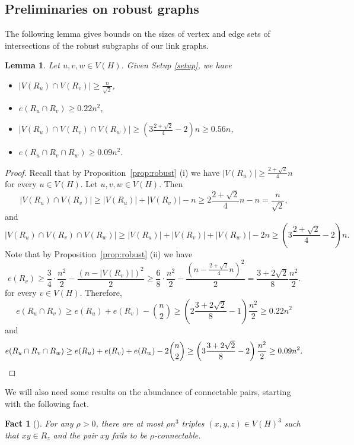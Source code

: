 \documentclass[A4paper,12pt]{article}
\newtheorem{lem}[thm]{Lemma}
\newtheorem{fact}[thm]{Fact}
\theoremstyle{definition}
\begin{document}
\subsection{Preliminaries on robust graphs}

The following lemma gives bounds on the sizes of vertex and edge sets of intersections of the robust subgraphs of our link graphs.  
\begin{lem}\label{lem:robust_intersections}
Let $u,v,w\in V(H)$. Given Setup \ref{setup}, we have
\begin{itemize}
    \item  $|V(R_u) \cap V(R_v)|\geq\frac{n}{\sqrt{2}}$,
    \item $e(R_u\cap R_v) \geq 0.22n^2$,  

\item $|V(R_u)\cap V(R_v)\cap V(R_w)|\geq \left(3\frac{2+\sqrt{2}}{4}-2 \right)n\geq 0.56n$,
\item $e(R_u\cap R_v\cap R_w)\geq 0.09n^2.$
\end{itemize}
\end{lem}
\begin{proof}
Recall that by Proposition~\ref{prop:robust} (i) we have $|V(R_u)|\geq \frac{2+\sqrt{2}}{4} n$ for every $u\in V(H)$.
Let $u,v,w\in V(H)$. Then 
\[
|V(R_u)\cap V(R_v)|\geq |V(R_u)| + |V(R_v)| - n\geq 2\frac{2+\sqrt{2}}{4} n-n=\frac{n}{\sqrt{2}},
\]
and 
\[
|V(R_u)\cap V(R_v)\cap V(R_w)|\geq |V(R_u)|+|V(R_v)|+|V(R_w)| - 2n\geq \left(3\frac{2+\sqrt{2}}{4}-2 \right)n.
\]
Note that by Proposition~\ref{prop:robust} (ii)  we have
\[
e(R_v)\geq  \frac{3}{4}\cdot \frac{n^2}{2}-\frac{(n-|V(R_v)|)^2}{2}\geq \frac{6}{8}\cdot \frac{n^2}{2}-\frac{(n-\frac{2+\sqrt{2}}{4}n)^2}{2}= \frac{3+2\sqrt{2}}{8} \frac{n^2}{2}.
\]
for every $v\in V(H)$.
Therefore, 
\[
e(R_u\cap R_v) \geq e(R_u)+e(R_v)-\binom{n}{2}\geq \left(2 \frac{3+2\sqrt{2}}{8}-1\right) \frac{n^2}{2}\geq 0.22n^2 
\]
and
\[
e(R_u\cap R_v\cap R_w) \geq e(R_u)+e(R_v)+e(R_w)-2\binom{n}{2}\geq \left(3 \frac{3+2\sqrt{2}}{8}-2\right) \frac{n^2}{2}\geq 0.09n^2. \qedhere
\]
\end{proof}

\bigskip

We will also need some results on the abundance of connectable pairs, starting with the following fact.

\begin{fact}[{\cite[Fact 4.1]{3hamcycle}}]
\label{fact:connectable}
For any $\rho > 0$, there are at most $\rho n^3$  triples $(x,y,z)\in V(H)^3$ such that 
$xy\in R_z$ and the pair $xy$ fails to be $\rho$-connectable. 
\end{fact}
\end{document}
